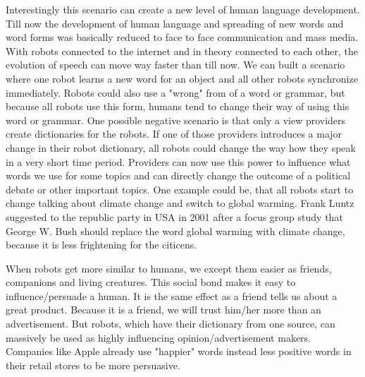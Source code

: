 \documentclass{acm_proc_article-sp}
\begin{document}
Interestingly this scenario can create a new level of human language development. Till now the development of human language and spreading of new words and word forms was basically reduced to face to face communication and mass media. With robots connected to the internet and in theory connected to each other, the evolution of speech can move way faster than till now. We can built a scenario where one robot learns a new word for an object and all other robots synchronize immediately. Robots could also use a "wrong" from of a word or grammar, but because all robots use this form, humans tend to change their way of using this word or grammar. One possible negative scenario is that only a view providers create dictionaries for the robots. If one of those providers introduces a major change in their robot dictionary, all robots could change the way how they speak in a very short time period. Providers can now use this power to influence what words we use for some topics and can directly change the outcome of a political debate or other important topics. One example could be, that all robots start to change talking about climate change and switch to global warming. Frank Luntz suggested to the republic party in USA in 2001 after a focus group study that George W. Bush should replace the word global warming with climate change, because it is less frightening for the citicens\cite{Burkeman2003}. 


When robots get more similar to humans, we except them easier as friends, companions and living creatures. This social bond makes it easy to influence/persuade a human. It is the same effect as a friend tells us about a great product. Because it is a friend, we will trust him/her more than an advertisement. But robots, which have their dictionary from one source, can massively be used as highly influencing opinion/advertisement makers. Companies like Apple already use "happier" words instead less positive words in their retail stores to be more persuasive\cite{Murphy2012}.  


\end{document}
